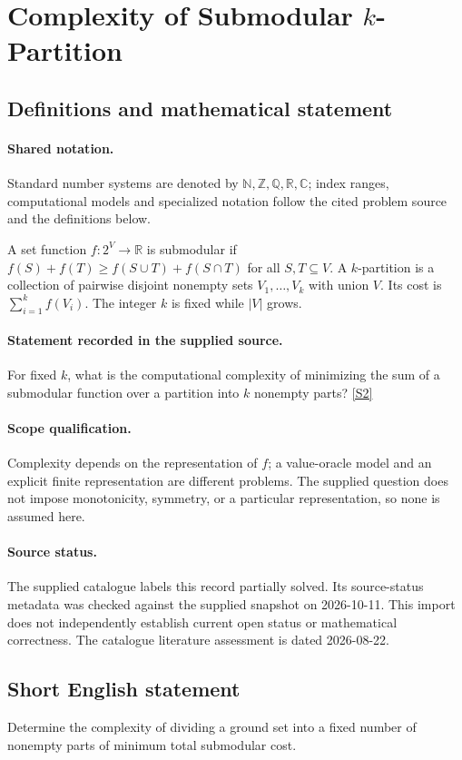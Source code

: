 \documentclass[11pt]{article}
\newcommand{\sref}[2]{\hyperlink{source:#1:#2}{[S#2]}}
\begin{document}
\section{Complexity of Submodular $k$-Partition}\label{statement}

\subsection{Definitions and mathematical statement}

\paragraph{Shared notation.}Standard number systems are denoted by $\mathbb N,\mathbb Z,\mathbb Q,\mathbb R,\mathbb C$; index ranges, computational models and specialized notation follow the cited problem source and the definitions below.


A set function $f:2^V\to\mathbb R$ is submodular if $f(S)+f(T)\geq f(S\cup T)+f(S\cap T)$ for all $S,T\subseteq V$. A $k$-partition is a collection of pairwise disjoint nonempty sets $V_1,\ldots,V_k$ with union $V$. Its cost is $\sum_{i=1}^kf(V_i)$. The integer $k$ is fixed while $|V|$ grows.
\paragraph{Statement recorded in the supplied source.}
For fixed $k$, what is the computational complexity of minimizing the sum of a submodular function over a partition into $k$ nonempty parts? \sref{statement}{2}
\paragraph{Scope qualification.}
Complexity depends on the representation of $f$; a value-oracle model and an explicit finite representation are different problems. The supplied question does not impose monotonicity, symmetry, or a particular representation, so none is assumed here.
\paragraph{Source status.}
The supplied catalogue labels this record partially solved. Its source-status metadata was checked against the supplied snapshot on 2026-10-11. This import does not independently establish current open status or mathematical correctness. The catalogue literature assessment is dated 2026-08-22.
\subsection{Short English statement}
Determine the complexity of dividing a ground set into a fixed number of nonempty parts of minimum total submodular cost.
\end{document}
